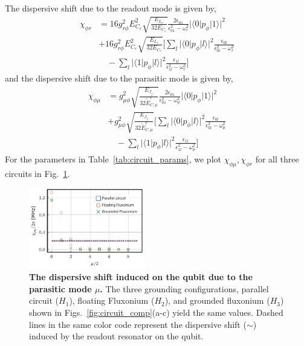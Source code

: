 \documentclass[%
reprint,
superscriptaddress,
 amsmath,amssymb,
 aps,
 prx,
longbibliography,
floatfix,
]{revtex4-2}
\begin{document}
{The dispersive shift due to the readout mode is given by,
\begin{align}
\chi_{\phi r}&=16g_{r\phi}^2E_{C_r}^2\sqrt{\frac{E_{L_r}}{32E_{C_r}}}\frac{2\epsilon_{01}}{\epsilon_{01}^2-\omega_r^2}|\langle 0|p_\phi|1 \rangle|^2\nonumber\\
   &+16g_{r\phi}^2E_{C_r}^2\sqrt{\frac{E_{L_r}}{32E_{C_r}}}\Bigg[\sum_l|\langle 0|p_\phi|l \rangle|^2\frac{\epsilon_{0l}}{\epsilon_{0l}^2-\omega_r^2}\nonumber\\&\quad-\sum_l|\langle 1|p_\phi|l \rangle|^2\frac{\epsilon_{1l}}{\epsilon_{1l}^2-\omega_r^2}\Bigg]
\end{align}
and the dispersive shift due to the parasitic mode is given by,
\begin{align}  
   \chi_{\phi\mu}&=g_{\mu\phi}^2\sqrt{\frac{E_{J_j}}{32\tilde{E}_{C,\mu}^e}}\frac{2\epsilon_{01}}{\epsilon_{01}^2-\omega_\mu^2}|\langle 0|p_\phi|1 \rangle|^2\nonumber\\
   &+g_{\mu\phi}^2\sqrt{\frac{E_{J_j}}{32\tilde{E}_{C,\mu}^e}}\Bigg[\sum_l|\langle 0|p_\phi|l \rangle|^2\frac{\epsilon_{0l}}{\epsilon_{0l}^2-\omega_\mu^2}\nonumber\\&\quad-\sum_l|\langle 1|p_\phi|l \rangle|^2\frac{\epsilon_{1l}}{\epsilon_{1l}^2-\omega_\mu^2}\Bigg]
\end{align}
}
For the parameters in Table~\ref{tab:circuit_params},  we plot $\chi_{\phi\mu},\chi_{\phi r}$ for all three circuits in Fig.~\ref{fig:dispersive-shift}. 
\begin{figure}[htb]
    \centering
    \includegraphics[width=0.45\textwidth]{Supp_Fig/dispersive_shift.pdf}
    \caption{ {\bf The dispersive shift induced on the qubit due to the parasitic mode $\mu$.} The three grounding configurations, parallel circuit ($H_1$), floating Fluxonium ($H_2$), and grounded fluxonium ($H_3$) shown in Figs.~\ref{fig:circuit_comp}(a-c) yield the same values. Dashed lines in the same color code represent the dispersive shift ($\sim $) induced by the readout resonator on the qubit.}
    \label{fig:dispersive-shift}
\end{figure}
\end{document}
